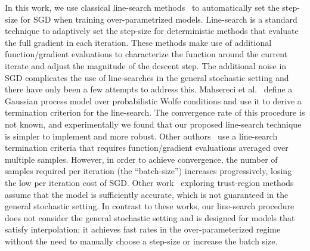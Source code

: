 In this work, we use classical line-search methods~\cite{nocedal2006numerical} to automatically set the step-size for SGD when training over-parametrized models. Line-search is a standard technique to adaptively set the step-size for deterministic methods that evaluate the full gradient in each iteration. These methods make use of additional function/gradient evaluations to characterize the function around the current iterate and adjust the magnitude of the descent step. The additional noise in SGD complicates the use of line-searches in the general stochastic setting and there have only been a few attempts to address this. Mahsereci et al.~\cite{mahsereci2017probabilistic} define a Gaussian process model over probabilistic Wolfe conditions and use it to derive a termination criterion for the line-search. The convergence rate of this procedure is not known, and experimentally we found that our proposed line-search technique is simpler to implement and more robust. Other authors~\cite{friedlander2012hybrid,byrd2012sample, de2016big, paquette2018stochastic,krejic2013line} use a line-search termination criteria that requires function/gradient evaluations averaged over multiple samples. However, in order to achieve convergence, the number of samples required per iteration (the ``batch-size'') increases progressively, losing the low per iteration cost of SGD. Other work~\cite{blanchet2019convergence,gratton2017complexity} exploring trust-region methods assume that the model is sufficiently accurate, which is not guaranteed in the general stochastic setting. In contrast to these works, our line-search procedure does not consider the general stochastic setting and is designed for models that satisfy interpolation; it achieves fast rates in the over-parameterized regime without the need to manually choose a step-size or increase the batch size.

\endinput
